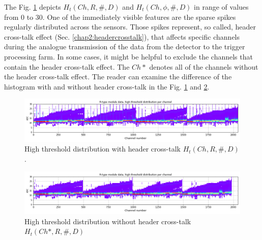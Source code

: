 The Fig. \ref{plot:P2-threshold-all-zoom} depicts $H_t(Ch, R, \#, D)$ and $H_t(Ch, \phi, \#, D)$ in range of values from 0 to 30.
One of the immediately visible features are the sparse spikes regularly distributed across the sensors.
Those spikes represent, so called, header cross-talk effect (Sec. \ref{chap2:headercrosstalk}), that affects specific channels during the analogue transmission of the data from the detector to the trigger processing farm.
In some cases, it might be helpful to exclude the channels that contain the header cross-talk effect.
The $Ch*$ denotes all of the channels without the header cross-talk effect.
The reader can examine the difference of the histogram with and without header cross-talk in the Fig. \ref{plot:P2-threshold-all-zoom} and \ref{plot:P2-threshold-all-zoom-nohc}.


\begin{figure}
    \centering
    \includegraphics[width=0.7\linewidth]{figures/chapter4/calib_analysis/P2-threshold-all-zoom.png}
    \caption{High threshold distribution with header cross-talk $H_t(Ch, R, \#, D)$.}
    \label{plot:P2-threshold-all-zoom}
\end{figure}

\begin{figure}
    \centering
    \includegraphics[width=0.7\linewidth]{figures/chapter4/calib_analysis/P2-threshold-all-zoom-nohc.png}
    \caption{High threshold distribution without header cross-talk $H_t(Ch*, R, \#, D)$}
    \label{plot:P2-threshold-all-zoom-nohc}
\end{figure}


